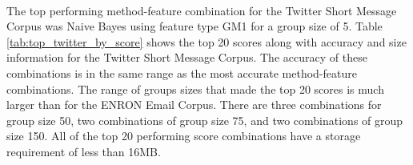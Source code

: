 \paragraph*{}  The top performing method-feature combination for the Twitter Short Message Corpus was Naive Bayes using feature type GM1 for a group size of 5.  Table \ref{tab:top_twitter_by_score} shows the top 20 scores along with accuracy and size information for the Twitter Short Message Corpus.  The accuracy of these combinations is in the same range as the most accurate method-feature combinations. The range of groups sizes that made the top 20 scores is much larger than for the ENRON Email Corpus.  There are three combinations for group size 50, two combinations of group size 75, and two combinations of group size 150. All of the top 20 performing score combinations have a storage requirement of less than 16MB.



